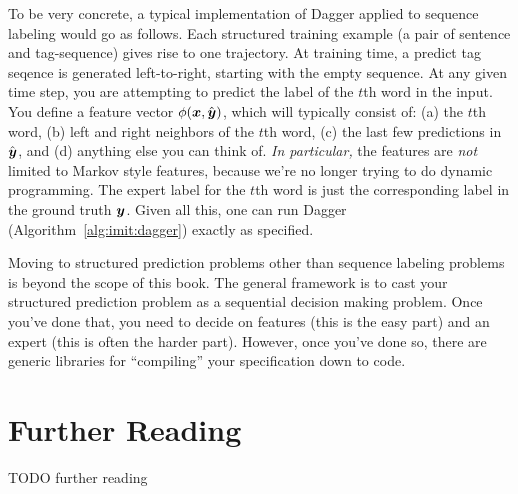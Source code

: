 To be very concrete, a typical implementation of Dagger applied to sequence labeling would go as follows.
Each structured training example (a pair of sentence and tag-sequence) gives rise to one trajectory.
At training time, a predict tag seqence is generated left-to-right, starting with the empty sequence.
At any given time step, you are attempting to predict the label of the $t$th word in the input.
You define a feature vector $\phi({\boldsymbol{x}},\hat{{\boldsymbol{y}}})$, which will typically consist of: (a) the $t$th word, (b) left and right neighbors of the $t$th word, (c) the last few predictions in $\hat{{\boldsymbol{y}}}$, and (d) anything else you can think of.
\emph{In particular,} the features are \emph{not} limited to Markov style features, because we're no longer trying to do dynamic programming.
The expert label for the $t$th word is just the corresponding label in the ground truth ${\boldsymbol{y}}$.
Given all this, one can run Dagger (Algorithm~\ref{alg:imit:dagger}) exactly as specified.

Moving to structured prediction problems other than sequence labeling problems is beyond the scope of this book.
The general framework is to cast your structured prediction problem as a sequential decision making problem.
Once you've done that, you need to decide on features (this is the easy part) and an expert (this is often the harder part).
However, once you've done so, there are generic libraries for ``compiling'' your specification down to code.

\section{Further Reading}

TODO further reading


